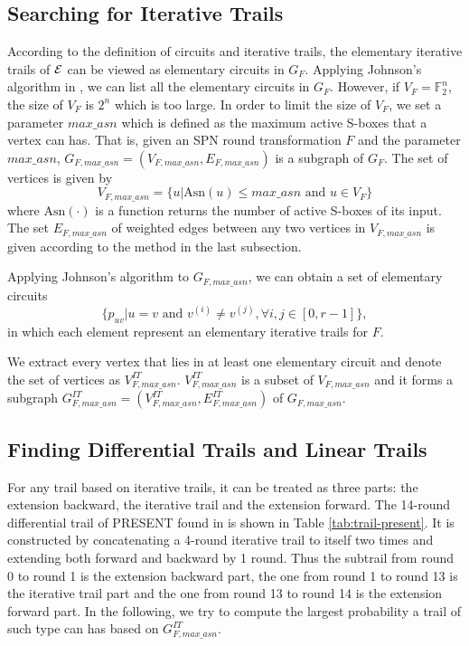 \subsection{Searching for Iterative Trails\label{subsec:iterative-trails}}

According to the definition of circuits and iterative trails, the elementary iterative trails of $\mathcal{E}$ can be viewed as elementary circuits in $G_F$. Applying Johnson's algorithm in \cite{J75}, we can list all the elementary circuits in $G_F$. However, if $V_F=\mathbb{F}_2^n$, the size of $V_F$ is $2^n$ which is too large. In order to limit the size of $V_F$, we set a parameter $max\_asn$ which is defined as the maximum active S-boxes that a vertex can has. That is, given an SPN round transformation $F$ and the parameter $max\_asn$, $G_{F,max\_asn}=(V_{F,max\_asn},E_{F,max\_asn})$ is a subgraph of $G_F$. The set of vertices is given by
\[
    V_{F,max\_asn}=\{u|\text{Asn}(u)\leq max\_asn \text{ and } u\in V_F\}
\]
where $\text{Asn}(\cdot)$ is a function returns the number of active S-boxes of its input. The set $E_{F,max\_asn}$ of weighted edges between any two vertices in $V_{F,max\_asn}$ is given according to the method in the last subsection. 

Applying Johnson's algorithm to $G_{F,max\_asn}$, we can obtain a set of elementary circuits
\[
    \{p_{uv}|u=v \text{ and } v^{(i)}\neq v^{(j)},\forall i,j\in[0,r-1]\},
\]
in which each element represent an elementary iterative trails for $F$. 

We extract every vertex that lies in at least one elementary circuit and denote the set of vertices as $V^{IT}_{F,max\_asn}$. $V^{IT}_{F,max\_asn}$ is a subset of $V_{F,max\_asn}$ and it forms a subgraph $G^{IT}_{F,max\_asn}=(V^{IT}_{F,max\_asn},E^{IT}_{F,max\_asn})$ of $G_{F,max\_asn}$. 

\subsection{Finding Differential Trails and Linear Trails\label{subsec:find-trails}}

For any trail based on iterative trails, it can be treated as three parts: the extension backward, the iterative trail and the extension forward. The 14-round differential trail of PRESENT found in \cite{W08} is shown in Table \ref{tab:trail-present}. It is constructed by concatenating a 4-round iterative trail to itself two times and extending both forward and backward by 1 round. Thus the subtrail from round 0 to round 1 is the extension backward part, the one from round 1 to round 13 is the iterative trail part and the one from round 13 to round 14 is the extension forward part. In the following, we try to compute the largest probability a trail of such type can has based on $G^{IT}_{F,max\_asn}$. 

